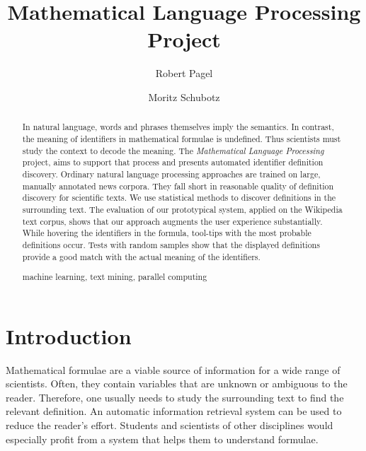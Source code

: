 \documentclass[runningheads]{llncs}
\newcommand{\keywords}[1]{\par\addvspace\baselineskip
\noindent\keywordname\enspace\ignorespaces#1}
\begin{document}
\mainmatter

\title{Mathematical Language Processing \\ Project}

\author{Robert Pagel \and Moritz Schubotz}



\maketitle


\begin{abstract}
In natural language, words and phrases themselves imply the semantics.
In contrast, the meaning of identifiers in mathematical formulae is undefined.
Thus scientists must study the context to decode the meaning.
The \emph{Mathematical Language Processing} project, aims to support that process and
presents automated identifier definition discovery.
Ordinary natural language processing approaches are trained on large, manually annotated news
corpora.
They fall short in reasonable quality of definition discovery for scientific texts.
We use statistical methods to discover definitions in the surrounding text.
The evaluation of our prototypical system, applied on the Wikipedia text
corpus, shows that our approach augments the user experience
substantially.
While hovering the identifiers in the formula, tool-tips with the most probable definitions
occur.
Tests with random samples show that the displayed definitions provide
a good match with the actual meaning of the identifiers.   
\keywords{machine learning, text mining, parallel computing}
\end{abstract}


\section{Introduction}

Mathematical formulae are a viable source of information for a wide range of
scientists.
Often, they contain variables that are unknown or ambiguous to the reader.
Therefore, one usually needs to study the surrounding text to find the relevant definition.
An automatic information retrieval system can be used to reduce the reader's
effort.
Students and scientists of other disciplines would especially profit from a 
system that helps them to understand formulae.
\end{document}
